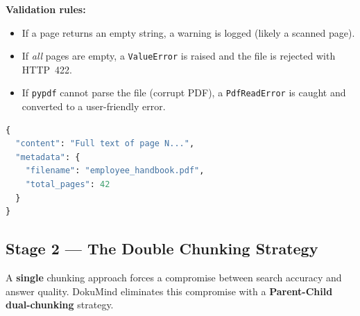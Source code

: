 \documentclass[12pt,a4paper]{report}
\begin{document}
\textbf{Validation rules:}
\begin{itemize}
  \item If a page returns an empty string, a warning is logged (likely a scanned page).
  \item If \emph{all} pages are empty, a \texttt{ValueError} is raised and the file is rejected with HTTP~422.
  \item If \texttt{pypdf} cannot parse the file (corrupt PDF), a \texttt{PdfReadError} is caught and converted to a user-friendly error.
\end{itemize}

\begin{lstlisting}[language=Python, caption=Page metadata structure returned by loader.py]
{
  "content": "Full text of page N...",
  "metadata": {
    "filename": "employee_handbook.pdf",
    "total_pages": 42
  }
}
\end{lstlisting}

\subsection{Stage 2 — The Double Chunking Strategy}

A \textbf{single} chunking approach forces a compromise between search accuracy and answer quality. DokuMind eliminates this compromise with a \textbf{Parent-Child dual-chunking} strategy.
\end{document}
